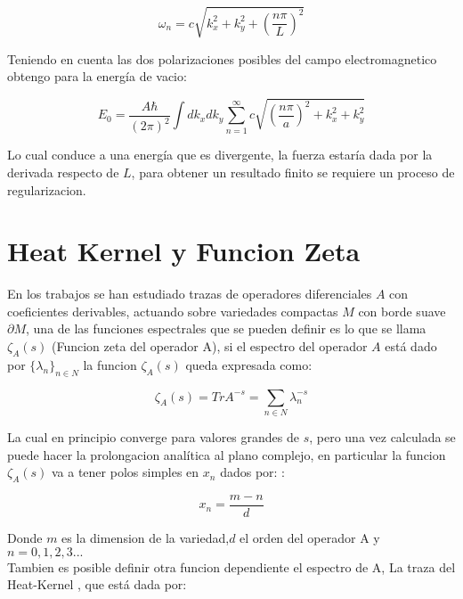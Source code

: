 \begin{equation}
\omega _n = c \sqrt{ k _x ^2 + k _y ^2 + \left( \frac{n \pi}{L} \right) ^2 }
\end{equation}

Teniendo en cuenta las dos polarizaciones posibles del campo electromagnetico obtengo para la energía de vacio:

\begin{equation}
E _0 = \frac{A \hbar }{(2 \pi) ^2} \int dk _x dk _y 
\sum _{n=1} ^{\infty} 
c
\sqrt{
		\left( \frac{n \pi}{a } \right) ^2 + k _x ^2 + k _y ^2
		}
\end{equation}


Lo cual conduce a una energía que es divergente, la fuerza estaría dada por la derivada respecto de $L$, para obtener un resultado finito se requiere un proceso de regularizacion.

\section{Heat Kernel y Funcion Zeta}


En los trabajos \cite{ Seeley:1967ea,10.2307/2373309,10.2307/2373312} se han estudiado trazas de operadores diferenciales $A$ con coeficientes derivables, actuando sobre variedades compactas $M$ con borde suave $\partial M$, una de las funciones espectrales que se pueden definir es lo que se llama $\zeta _A (s)$ (Funcion zeta del operador A), si el espectro del operador $A$ está dado por $ \{ \lambda _n \} _{n \in N}$ la funcion $\zeta _A (s)$ queda expresada como:


\begin{equation}
\zeta _A (s) = Tr A ^{-s} = \sum _{n \in N}  \lambda _n ^{-s}
\label{funcion.zeta}
\end{equation}

La cual en principio converge para valores grandes de $s$, pero una vez calculada se puede hacer la prolongacion analítica al plano complejo, en particular la funcion $\zeta _A (s)$ va a tener polos simples en $x _n$ dados por:   :

\begin{equation}
x _n = \frac{m-n}{d} 
\label{eq.ceros.zeta}
\end{equation}

Donde $m$ es la dimension de la variedad,$d$ el orden del operador A y $n= 0,1,2,3 ...$ \\

Tambien es posible definir otra funcion dependiente el espectro de A, La traza del Heat-Kernel \cite{VASSILEVICH2003279}, que está dada por:


